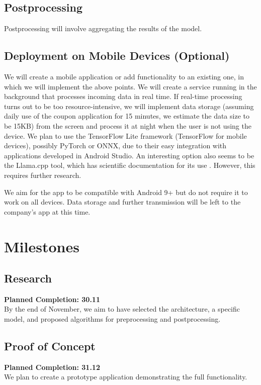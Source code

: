\documentclass[12pt]{article}
\begin{document}
\subsection*{Postprocessing}
Postprocessing will involve aggregating the results of the model.
    
\subsection*{Deployment on Mobile Devices (Optional)}
We will create a mobile application or add functionality to an existing one, in which we will implement the above points. We will create a service running in the background that processes incoming data in real time. If real-time processing turns out to be too resource-intensive, we will implement data storage (assuming daily use of the coupon application for 15 minutes, we estimate the data size to be 15KB) from the screen and process it at night when the user is not using the device. We plan to use the TensorFlow Lite framework (TensorFlow for mobile devices), possibly PyTorch or ONNX, due to their easy integration with applications developed in Android Studio. An interesting option also seems to be the Llama.cpp tool, which has scientific documentation for its use \cite{LLMmobile2024}. However, this requires further research. 

We aim for the app to be compatible with Android 9+ but do not require it to work on all devices. Data storage and further transmission will be left to the company's app at this time.

\section*{Milestones}

\subsection*{Research}
\textbf{Planned Completion: 30.11}\\
By the end of November, we aim to have selected the architecture, a specific model, and proposed algorithms for preprocessing and postprocessing.

\subsection*{Proof of Concept}
\textbf{Planned Completion: 31.12}\\
We plan to create a prototype application demonstrating the full functionality.
\end{document}
